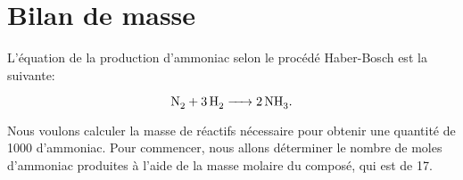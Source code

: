\documentclass{article}
\begin{document}
%
%
%
%


\section{Bilan de masse}

L'équation de la production d'ammoniac selon le procédé Haber-Bosch est la suivante: 

\[
  \ce {N2 + 3H2 -> 2NH3}
  \text.
\]

Nous voulons calculer la masse de réactifs nécessaire pour obtenir une quantité de \unit{1000}{\tonne}  d'ammoniac. Pour commencer, nous allons déterminer le nombre de moles d'ammoniac produites à l'aide de la masse molaire du composé, qui est de \unit{17}{\gram\per\mole}.
\end{document}
